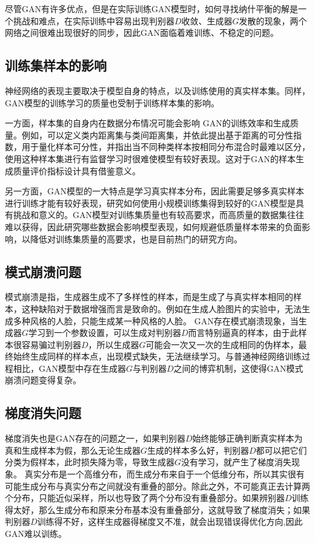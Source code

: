 \documentclass[lang=cn,a4paper,12pt,bibend=biber]{GAN}
\begin{document}
尽管GAN有许多优点，但是在实际训练GAN模型时，如何寻找纳什平衡的解是一个挑战和难点，在实际训练中容易出现判别器$D$收敛、生成器$G$发散的现象，两个网络之间很难出现很好的同步，因此GAN面临着难训练、不稳定的问题。

\subsection{训练集样本的影响}

神经网络的表现主要取决于模型自身的特点，以及训练使用的真实样本集。同样，GAN模型的训练学习的质量也受制于训练样本集的影响。

一方面，样本集的自身内在数据分布情况可能会影响 GAN的训练效率和生成质量。例如，可以定义类内距离集与类间距离集，并依此提出基于距离的可分性指数，用于量化样本可分性，并指出当不同种类样本按相同分布混合时最难以区分，使用这种样本集进行有监督学习时很难使模型有较好表现。这对于GAN的样本生成质量评价指标设计具有借鉴意义。

另一方面，GAN模型的一大特点是学习真实样本分布，因此需要足够多真实样本进行训练才能有较好表现，研究如何使用小规模训练集得到较好的GAN模型是具有挑战和意义的。GAN模型对训练集质量也有较高要求，而高质量的数据集往往难以获得，因此研究哪些数据会影响模型表现，如何规避低质量样本带来的负面影响，以降低对训练集质量的高要求，也是目前热门的研究方向。


\subsection{模式崩溃问题}

模式崩溃是指，生成器生成不了多样性的样本，而是生成了与真实样本相同的样本，这种缺陷对于数据增强而言是致命的。例如在生成人脸图片的实验中，无法生成多种风格的人脸，只能生成某一种风格的人脸。
GAN存在模式崩溃现象，当生成器$G$学习到一个参数设置，可以生成对判别器$D$而言特别逼真的样本，由于此样本很容易骗过判别器$D$，所以生成器$G$可能会一次又一次的生成相同的伪样本，最终始终生成同样的样本点，出现模式缺失，无法继续学习。与普通神经网络训练过程相比，GAN模型中存在生成器$G$与判别器$D$之间的博弈机制，这使得GAN模式崩溃问题变得复杂。

\subsection{梯度消失问题}

梯度消失也是GAN存在的问题之一，如果判别器$D$始终能够正确判断真实样本为真和生成样本为假，那么无论生成器$G$生成的样本多么好，判别器$D$都可以把它们分类为假样本，此时损失降为零，导致生成器$G$没有学习，就产生了梯度消失现象。
真实分布是一个高维分布，而生成分布来自于一个低维分布，所以其实很有可能生成分布与真实分布之间就没有重叠的部分。除此之外，不可能真正去计算两个分布，只能近似采样，所以也导致了两个分布没有重叠部分。如果辨别器$D$训练得太好，那么生成分布和原来分布基本没有重叠部分，这就导致了梯度消失；如果判别器$D$训练得不好，这样生成器得梯度又不准，就会出现错误得优化方向,因此GAN难以训练。
\end{document}
